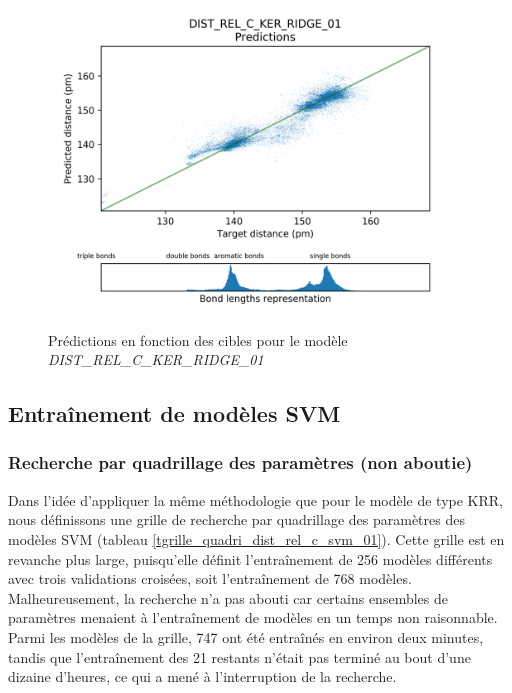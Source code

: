 \begin{figure}
	\centering
	
	\includegraphics[scale=0.8]{../figures/DIST_REL_C_KER_RIDGE_01/DIST_REL_C_KER_RIDGE_01_preds_targets.png}	
	
	\caption{Prédictions en fonction des cibles pour le modèle \emph{DIST\_REL\_C\_KER\_RIDGE\_01}}
	\label{fpreds_targets_dist_rel_c_ker_ridge_01}
\end{figure}

\subsection{Entraînement de modèles SVM}

\subsubsection{Recherche par quadrillage des paramètres (non aboutie)}
Dans l'idée d'appliquer la même méthodologie que pour le modèle de type KRR, nous définissons une grille de recherche par quadrillage des paramètres des modèles SVM (tableau \ref{tgrille_quadri_dist_rel_c_svm_01}). Cette grille est en revanche plus large, puisqu'elle définit l'entraînement de 256 modèles différents avec trois validations croisées, soit l'entraînement de 768 modèles. Malheureusement, la recherche n'a pas abouti car certains ensembles de paramètres menaient à l'entraînement de modèles en un temps non raisonnable. Parmi les modèles de la grille, 747 ont été entraînés en environ deux minutes, tandis que l'entraînement des 21 restants n'était pas terminé au bout d'une dizaine d'heures, ce qui a mené à l'interruption de la recherche.


